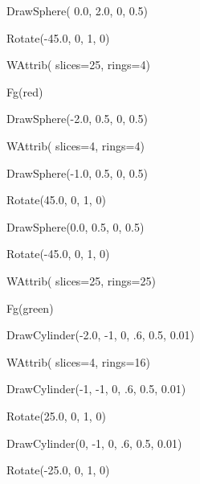 \documentclass[letterpaper]{article}
\begin{document}
{\sffamily
\ \ \ DrawSphere( 0.0, 2.0, 0, 0.5)}

{\sffamily
\ \ \ Rotate(-45.0, 0, 1, 0)}


\bigskip

{\sffamily
\ \ \ WAttrib( {\textquotedbl}slices=25{\textquotedbl}, {\textquotedbl}rings=4{\textquotedbl}) \ \ }

{\sffamily
\ \ \ Fg({\textquotedbl}red{\textquotedbl}) \ }

{\sffamily
\ \ \ DrawSphere(-2.0, 0.5, 0, 0.5)}


\bigskip

{\sffamily
\ \ \ WAttrib( {\textquotedbl}slices=4{\textquotedbl}, {\textquotedbl}rings=4{\textquotedbl}) \ \ }

{\sffamily
\ \ \ DrawSphere(-1.0, 0.5, 0, 0.5)}


\bigskip

{\sffamily
\ \ \ Rotate(45.0, 0, 1, 0)}

{\sffamily
\ \ \ DrawSphere(0.0, 0.5, 0, 0.5)}

{\sffamily
\ \ \ Rotate(-45.0, 0, 1, 0)}


\bigskip

{\sffamily
\ \ \ WAttrib( {\textquotedbl}slices=25{\textquotedbl}, {\textquotedbl}rings=25{\textquotedbl}) \ \ }

{\sffamily
\ \ \ Fg({\textquotedbl}green{\textquotedbl}) \ }

{\sffamily
\ \ \ DrawCylinder(-2.0, -1, 0, .6, 0.5, 0.01)}


\bigskip

{\sffamily
\ \ \ WAttrib( {\textquotedbl}slices=4{\textquotedbl}, {\textquotedbl}rings=16{\textquotedbl}) \ \ }

{\sffamily
\ \ \ DrawCylinder(-1, -1, 0, .6, 0.5, 0.01)}


\bigskip

{\sffamily
\ \ \ Rotate(25.0, 0, 1, 0)}

{\sffamily
\ \ \ DrawCylinder(0, -1, 0, .6, 0.5, 0.01)}

{\sffamily
\ \ \ Rotate(-25.0, 0, 1, 0)}
\end{document}
